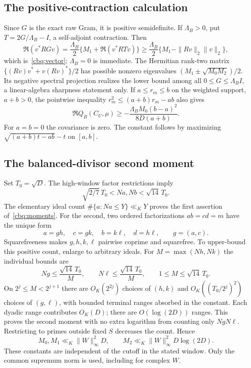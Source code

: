 \documentclass[11pt]{article}
\theoremstyle{definition}\newtheorem{definition}[theorem]{Definition}
\theoremstyle{remark}\newtheorem{remark}[theorem]{Remark}
\begin{document}
\subsection{The positive-contraction calculation}
Since $G$ is the exact raw Gram, it is positive semidefinite. If
$\Lambda_B>0$, put $T=2G/\Lambda_B-I$, a self-adjoint contraction. Then
\[
 \Re(v^*RGv)=\frac{\Lambda_B}{2}
 \{M_1+\Re(v^*RTv)\}
 \ge\frac{\Lambda_B}{2}\{M_1-\|Rv\|_2\|v\|_2\},
\]
which is~\eqref{cbq:vector}; $\Lambda_B=0$ is immediate.
The Hermitian rank-two matrix
$\{(Rv)v^*+v(Rv)^*\}/2$ has possible nonzero eigenvalues
$(M_1\pm\sqrt{M_0M_2})/2$. Its negative spectral projection realizes
the lower bound among all $0\le G\le\Lambda_B I$, a linear-algebra
sharpness statement only. If $a\le r_m\le b$ on the weighted support,
$a+b>0$, the pointwise inequality $r_m^2\le(a+b)r_m-ab$ also gives
\[
 \Re Q_B(C_U,\mu)\ge
 -\frac{\Lambda_B M_0(b-a)^2}{8D(a+b)}.
\]
For $a=b=0$ the covariance is zero. The constant follows by maximizing
$\sqrt{(a+b)t-ab}-t$ on $[a,b]$.

\subsection{The balanced-divisor second moment}
Set $T_0=\sqrt D$. The high-window factor restrictions imply
\[
 \sqrt{2/7}\,T_0<Na,Nb<\sqrt{14}\,T_0.
\]
The elementary ideal count $\#\{a:Na\le Y\}\ll_K Y$ proves the
first assertion of~\eqref{cbq:moments}. For the second, two ordered
factorizations $ab=cd=m$ have the unique form
\[
 a=gh,\quad c=gk,\quad b=k\ell,\quad d=h\ell,
 \qquad g=(a,c).
\]
Squarefreeness makes $g,h,k,\ell$ pairwise coprime and squarefree.
To upper-bound this positive count, enlarge to arbitrary ideals.
For $M=\max(Nh,Nk)$ the individual bounds are
\[
 Ng\le\frac{\sqrt{14}\,T_0}{M},\qquad
 N\ell\le\frac{\sqrt{14}\,T_0}{M},\qquad
 1\le M\le\sqrt{14}\,T_0.
\]
On $2^j\le M<2^{j+1}$ there are $O_K(2^{2j})$ choices of $(h,k)$
and $O_K((T_0/2^j)^2)$ choices of $(g,\ell)$, with bounded terminal
ranges absorbed in the constant. Each dyadic range contributes $O_K(D)$;
there are $O(\log(2D))$ ranges. This proves the second moment with no
extra logarithm from counting only $NgN\ell$. Restricting to primes
outside fixed $S$ decreases the count. Hence
\[
 M_0,M_1\ll_K\|W\|_\infty^2D,\qquad
 M_2\ll_K\|W\|_\infty^2D\log(2D).
\]
These constants are independent of the cutoff in the stated window.
Only the common supremum norm is used, including for complex $W$.
\end{document}
